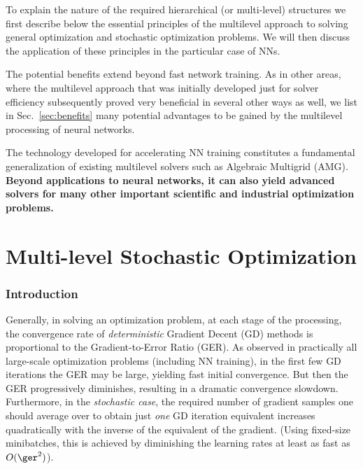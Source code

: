 \documentclass{article} %
\begin{document}
To explain the nature of the required hierarchical (or multi-level) structures we first describe below the essential principles of the multilevel approach to solving general optimization and stochastic optimization problems. We will then discuss the application of these principles in the particular case of NNs.

The potential benefits extend beyond fast network training. As in other areas, where the multilevel approach that was initially developed just for solver efficiency subsequently proved very beneficial in several other ways as well, we list in Sec.~\ref{sec:benefits} many potential advantages to be gained by the multilevel processing of neural networks. 

The technology developed for accelerating NN training constitutes a fundamental generalization of existing multilevel solvers such as Algebraic Multigrid (AMG). \textbf{Beyond applications to neural networks, it can also yield advanced solvers for many other important scientific and industrial optimization problems.}


\newpage
\part{Multi-level Stochastic Optimization}
\label{sec:stochastic_optimization}

\section{Introduction}
Generally, in solving an optimization problem, at each stage of the processing, the convergence rate of {\it deterministic} Gradient Decent (GD) methods is proportional to the Gradient-to-Error Ratio (GER). As observed in practically all large-scale optimization problems (including NN training), in the first few GD iterations the GER may be large, yielding fast initial convergence. But then the GER progressively diminishes, resulting in a dramatic convergence slowdown. Furthermore, in the {\it stochastic case}, the required number of gradient samples one should average over to obtain just {\it one} GD iteration equivalent increases quadratically with the inverse of the equivalent of the gradient. (Using fixed-size minibatches, this is achieved by diminishing the learning rates at least as fast as $O(\ger^2)$).
\end{document}
